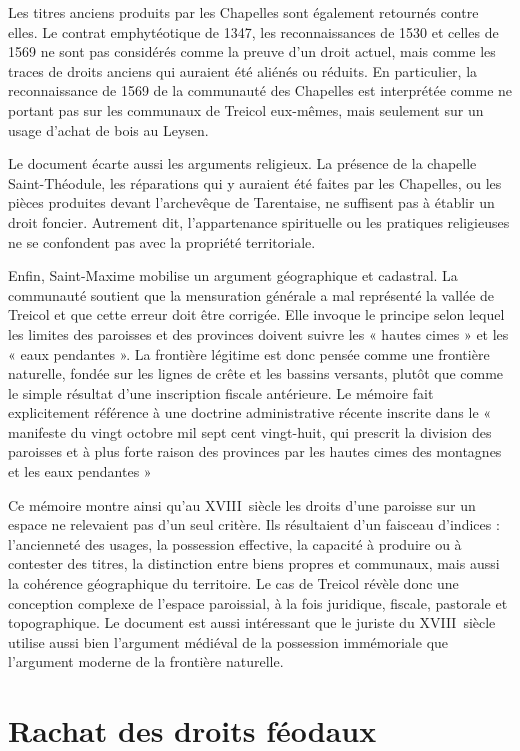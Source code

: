 \documentclass[12pt,a4paper]{report}
\begin{document}
	Les titres anciens produits par les Chapelles sont également retournés contre elles. Le contrat emphytéotique de 1347, les reconnaissances de 1530 et celles de 1569 ne sont pas considérés comme la preuve d'un droit actuel, mais comme les traces de droits anciens qui auraient été aliénés ou réduits. En particulier, la reconnaissance de 1569 de la communauté des Chapelles est interprétée comme ne portant pas sur les communaux de Treicol eux-mêmes, mais seulement sur un usage d'achat de bois au Leysen. 
	
	Le document écarte aussi les arguments religieux. La présence de la chapelle Saint-Théodule, les réparations qui y auraient été faites par les Chapelles, ou les pièces produites devant l'archevêque de Tarentaise, ne suffisent pas à établir un droit foncier. Autrement dit, l'appartenance spirituelle ou les pratiques religieuses ne se confondent pas avec la propriété territoriale. 
	
	Enfin, Saint-Maxime mobilise un argument géographique et cadastral. La communauté soutient que la mensuration générale a mal représenté la vallée de Treicol et que cette erreur doit être corrigée. Elle invoque le principe selon lequel les limites des paroisses et des provinces doivent suivre les « hautes cimes » et les « eaux pendantes ». La frontière légitime est donc pensée comme une frontière naturelle, fondée sur les lignes de crête et les bassins versants, plutôt que comme le simple résultat d'une inscription fiscale antérieure. 
	Le mémoire fait explicitement référence à une doctrine administrative récente inscrite dans le  « manifeste du vingt octobre mil sept cent vingt-huit, qui prescrit la division des paroisses et à plus forte raison des provinces par les hautes cimes des montagnes et les eaux pendantes »
	
	Ce mémoire montre ainsi qu'au XVIII\ieme\ siècle les droits d'une paroisse sur un espace ne relevaient pas d'un seul critère. Ils résultaient d'un faisceau d'indices : l'ancienneté des usages, la possession effective, la capacité à produire ou à contester des titres, la distinction entre biens propres et communaux, mais aussi la cohérence géographique du territoire. Le cas de Treicol révèle donc une conception complexe de l'espace paroissial, à la fois juridique, fiscale, pastorale et topographique. Le document est aussi intéressant que le juriste du XVIII\ieme\ siècle utilise aussi bien l'argument médiéval de la possession immémoriale que l'argument moderne de la frontière naturelle.
	
\section{Rachat des droits féodaux}
\label{sec:Affranchissements}
\end{document}
